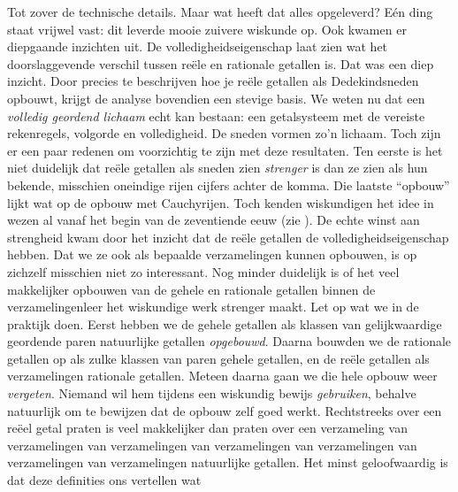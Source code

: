 \documentclass[../../../include/open-logic-section]{subfiles}
\begin{document}
Tot zover de technische details. Maar wat heeft dat alles opgeleverd?
Eén ding staat vrijwel vast: dit leverde {mooie} zuivere wiskunde op.
Ook kwamen er diepgaande inzichten uit. De volledigheidseigenschap
laat zien wat het doorslaggevende verschil tussen reële en rationale
getallen is. Dat was een diep inzicht. Door precies te beschrijven hoe je
reële getallen als Dedekindsneden opbouwt, krijgt de analyse bovendien een stevige
basis. We weten nu dat een \emph{volledig geordend lichaam} echt kan
bestaan: een getalsysteem met de vereiste rekenregels, volgorde en
volledigheid. De sneden vormen zo'n lichaam.
Toch zijn er een paar redenen om voorzichtig te zijn met deze resultaten.
Ten eerste is het niet duidelijk dat reële getallen als sneden zien
\emph{strenger} is dan ze zien als hun bekende, misschien oneindige
rijen cijfers achter de komma. Die laatste ``opbouw'' lijkt wat op de
opbouw met Cauchyrijen. Toch kenden wiskundigen het idee in wezen al
vanaf het begin van de zeventiende eeuw (zie ). De
echte winst aan strengheid kwam door het inzicht dat de reële getallen de
volledigheidseigenschap hebben. Dat we ze ook als bepaalde
verzamelingen kunnen opbouwen, is op zichzelf misschien niet zo
interessant.
Nog minder duidelijk is of het veel makkelijker opbouwen van de gehele en
rationale getallen binnen de verzamelingenleer het wiskundige werk strenger maakt. Let op wat we in de
praktijk doen. Eerst hebben we de gehele getallen als klassen van
gelijkwaardige geordende paren natuurlijke getallen
\emph{opgebouwd}. Daarna bouwden we de rationale getallen op als zulke
klassen van paren gehele getallen, en de reële getallen als
verzamelingen rationale getallen. Meteen daarna gaan we die hele opbouw
weer \emph{vergeten}. Niemand wil hem tijdens een wiskundig bewijs
\emph{gebruiken}, behalve natuurlijk om te bewijzen dat de opbouw zelf
goed werkt. Rechtstreeks over een reëel getal praten is veel
makkelijker dan praten over een verzameling van verzamelingen van
verzamelingen van verzamelingen van verzamelingen van verzamelingen van
verzamelingen natuurlijke getallen.
%
%
%
Het minst geloofwaardig is dat deze definities ons vertellen wat
\end{document}
